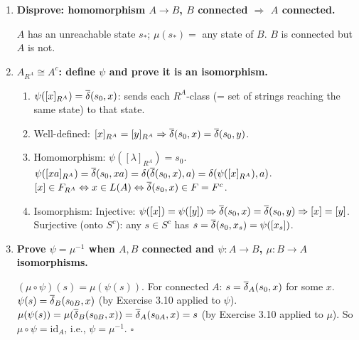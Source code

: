 \begin{enumerate}[{3.}1.]
Counterexample: $B$ has disconnected states; map all reachable states of $A$ to the connected part of $B$, and the disconnected states of $B$ have no preimage. The homomorphism $\mu$ maps $S_A$ into the connected part of $B$, and $B$ has extra states. $\mu$ is a valid homomorphism (on the domain $S_A$) but $B$ is not connected.

\item \textbf{Disprove: homomorphism $A\to B$, $B$ connected $\Rightarrow$ $A$ connected.}

$A$ has an unreachable state $s_*$; $\mu(s_*)=$ any state of $B$. $B$ is connected but $A$ is not.

\item \textbf{$A_{R^A}\cong A^c$: define $\psi$ and prove it is an isomorphism.}

\begin{enumerate}
\item $\psi([x]_{R^A})=\overline{\delta}(s_0,x)$: sends each $R^A$-class (= set of strings reaching the same state) to that state.

\item Well-defined: $[x]_{R^A}=[y]_{R^A}\Rightarrow\overline{\delta}(s_0,x)=\overline{\delta}(s_0,y)$. \checkmark

\item Homomorphism: $\psi([\lambda]_{R^A})=s_0$. $\psi([xa]_{R^A})=\overline{\delta}(s_0,xa)=\delta(\overline{\delta}(s_0,x),a)=\delta(\psi([x]_{R^A}),a)$. $[x]\in F_{R^A}\Leftrightarrow x\in L(A)\Leftrightarrow\overline{\delta}(s_0,x)\in F=F^c$. \checkmark

\item Isomorphism: Injective: $\psi([x])=\psi([y])\Rightarrow\overline{\delta}(s_0,x)=\overline{\delta}(s_0,y)\Rightarrow[x]=[y]$. Surjective (onto $S^c$): any $s\in S^c$ has $s=\overline{\delta}(s_0,x_s)=\psi([x_s])$.
\end{enumerate}

\item \textbf{Prove $\psi=\mu^{-1}$ when $A,B$ connected and $\psi: A\to B$, $\mu: B\to A$ isomorphisms.}

$(\mu\circ\psi)(s)=\mu(\psi(s))$. For connected $A$: $s=\overline{\delta}_A(s_0,x)$ for some $x$. $\psi(s)=\overline{\delta}_B(s_{0B},x)$ (by Exercise 3.10 applied to $\psi$). $\mu(\psi(s))=\mu(\overline{\delta}_B(s_{0B},x))=\overline{\delta}_A(s_{0A},x)=s$ (by Exercise 3.10 applied to $\mu$). So $\mu\circ\psi=\mathrm{id}_A$, i.e., $\psi=\mu^{-1}$. $\square$


\end{enumerate}
